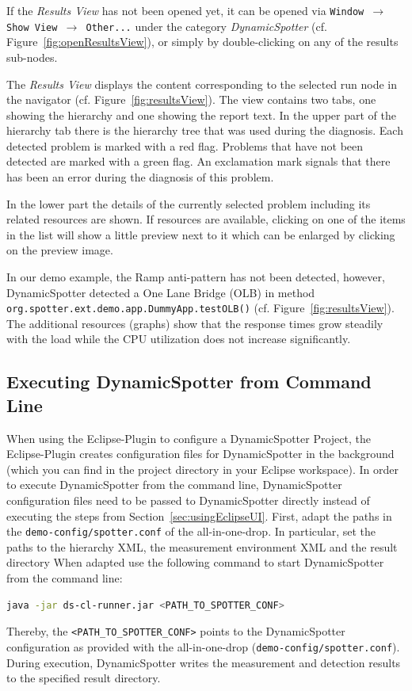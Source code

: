 \documentclass{report}
\newcommand{\DS}{DynamicSpotter }
\begin{document}
If the
\emph{Results View} has not been opened yet, it can be opened via \texttt{Window \(\rightarrow\) Show View
\(\rightarrow\) Other...} under the category \emph{\DS} (cf. Figure~\ref{fig:openResultsView}), or simply by
double-clicking on any of the results sub-nodes.

The \emph{Results View} displays the content corresponding to the selected run node in the navigator (cf.
Figure~\ref{fig:resultsView}).
The view contains two tabs, one showing the hierarchy and one showing the report text.
In the upper part of the hierarchy tab there is the hierarchy tree that was used during the diagnosis.
Each detected problem is marked with a red flag. Problems that have not been detected are marked with a green flag.
An exclamation mark signals that there has been an error during the diagnosis of this problem.

In the lower part the details of the currently selected problem including its related resources are shown.
If resources are available, clicking on one of the items in the list will show a little preview next to it which can be enlarged by clicking on the preview image.

In our demo example, the Ramp anti-pattern has not been detected, however, \DS detected a One Lane Bridge (OLB) in
method \texttt{org.spotter.ext.demo.app.DummyApp.testOLB()} (cf. Figure~\ref{fig:resultsView}). The additional resources
(graphs) show that the response times grow steadily with the load while the CPU utilization does not increase
significantly.


\subsection{Executing \DS from Command Line}
\label{sec:usingCommandLine}
When using the Eclipse-Plugin to configure a \DS Project, the Eclipse-Plugin creates configuration files for \DS in the
background (which you can find in the project directory in your Eclipse workspace).
In order to execute \DS from the command line, \DS configuration files need to be passed to \DS directly instead of
executing the steps from Section~\ref{sec:usingEclipseUI}. 
First, adapt the paths in the \texttt{demo-config/spotter.conf} of the all-in-one-drop. In particular, set the paths to
the hierarchy XML, the measurement environment XML and the result directory 
When adapted use the following command to start \DS from the command line:
\begin{lstlisting}[language=sh,morekeywords={java,javaagent,port, rootDir}, frame=single]
java -jar ds-cl-runner.jar <PATH_TO_SPOTTER_CONF>
\end{lstlisting}
Thereby, the \texttt{<PATH\_TO\_SPOTTER\_CONF>} points to the \DS configuration as provided with the all-in-one-drop
(\texttt{demo-config/spotter.conf}). During execution, \DS writes the measurement and detection results to the specified
result directory.
\end{document}
